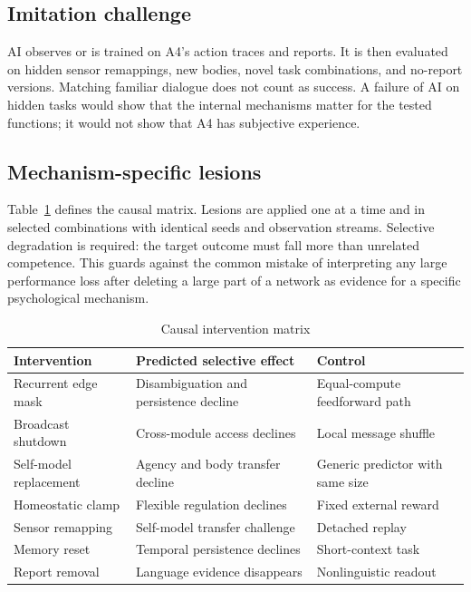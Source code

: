 \documentclass[conference]{IEEEtran}
\begin{document}
\subsection{Imitation challenge}

AI observes or is trained on A4's action traces and reports. It is then evaluated on hidden sensor remappings, new bodies, novel task combinations, and no-report versions. Matching familiar dialogue does not count as success. A failure of AI on hidden tasks would show that the internal mechanisms matter for the tested functions; it would not show that A4 has subjective experience.

\subsection{Mechanism-specific lesions}

Table~\ref{tab:lesions} defines the causal matrix. Lesions are applied one at a time and in selected combinations with identical seeds and observation streams. Selective degradation is required: the target outcome must fall more than unrelated competence. This guards against the common mistake of interpreting any large performance loss after deleting a large part of a network as evidence for a specific psychological mechanism.

\begin{table}[t]
\caption{Causal intervention matrix}
\label{tab:lesions}
\centering
\scriptsize
\begin{tabular}{p{}p{}p{}}
\toprule
Intervention & Predicted selective effect & Control \\
\midrule
Recurrent edge mask & Disambiguation and persistence decline & Equal-compute feedforward path \\
Broadcast shutdown & Cross-module access declines & Local message shuffle \\
Self-model replacement & Agency and body transfer decline & Generic predictor with same size \\
Homeostatic clamp & Flexible regulation declines & Fixed external reward \\
Sensor remapping & Self-model transfer challenge & Detached replay \\
Memory reset & Temporal persistence declines & Short-context task \\
Report removal & Language evidence disappears & Nonlinguistic readout \\
\bottomrule
\end{tabular}
\end{table}
\end{document}
